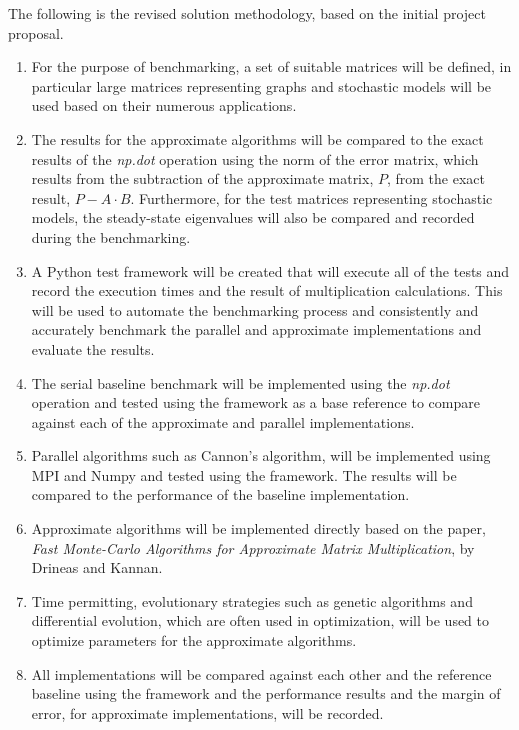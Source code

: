 \documentclass[oneside]{article}
\begin{document}
The following is the revised solution methodology, based on the initial project proposal.

\begin{enumerate}
\item For the purpose of benchmarking, a set of suitable matrices will be defined, in particular large matrices representing graphs and stochastic models will be used based on their numerous applications\cite{yegnanarayanan2013application}.

\item The results for the approximate algorithms will be compared to the exact results of the \emph{np.dot} operation using the norm of the error matrix, which results from the subtraction of the approximate matrix, $P$, from the exact result, $P - A \cdot B$\cite{drineas2001fast}. Furthermore, for the test matrices representing stochastic models, the steady-state eigenvalues will also be compared and recorded during the benchmarking.

\item A Python test framework will be created that will execute all of the tests and record the execution times and the result of multiplication calculations. This will be used to automate the benchmarking process and consistently and accurately benchmark the parallel and approximate implementations and evaluate the results.

\item The serial baseline benchmark will be implemented using the \emph{np.dot} operation and tested using the framework as a base reference to compare against each of the approximate and parallel implementations.

\item Parallel algorithms such as Cannon's algorithm\cite{lee1997generalized}, will be implemented using MPI and Numpy and tested using the framework. The results will be compared to the performance of the baseline implementation.

\item Approximate algorithms will be implemented directly based on the paper, \emph{Fast Monte-Carlo Algorithms for Approximate Matrix Multiplication}\cite{drineas2001fast}, by Drineas and Kannan.

\item Time permitting, evolutionary strategies such as genetic algorithms and differential evolution, which are often used in optimization\cite{de1989using}, will be used to optimize parameters for the approximate algorithms.

\item All implementations will be compared against each other and the reference baseline using the framework and the performance results and the margin of error, for approximate implementations, will be recorded.
\end{enumerate}
\end{document}
